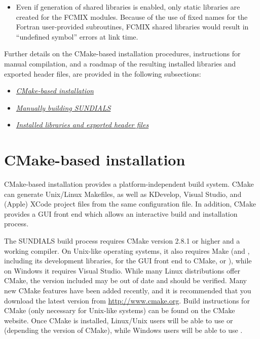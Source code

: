\documentclass[letterpaper,10pt,english]{sphinxmanual}
\begin{document}
\begin{itemize}
\item {} 
Even if generation of shared libraries is enabled, only static
libraries are created for the FCMIX modules.  Because of the use of
fixed names for the Fortran user-provided subroutines, FCMIX shared
libraries would result in ``undefined symbol'' errors at link time.

\end{itemize}

Further details on the CMake-based installation procedures,
instructions for manual compilation, and a roadmap of the resulting
installed libraries and exported header files, are provided in the
following subsections:
\begin{itemize}
\item {} 
{\hyperref[Install:installation-cmake]{\emph{CMake-based installation}}}

\item {} 
{\hyperref[Install:installation-manual]{\emph{Manually building SUNDIALS}}}

\item {} 
{\hyperref[Install:installation-results]{\emph{Installed libraries and exported header files}}}

\end{itemize}


\section{CMake-based installation}
\label{Install:installation-cmake}\label{Install:cmake-based-installation}
CMake-based installation provides a platform-independent build system.
CMake can generate Unix/Linux Makefiles, as well as KDevelop, Visual
Studio, and (Apple) XCode project files from the same configuration
file.  In addition, CMake provides a GUI front end which allows an
interactive build and installation process.

The SUNDIALS build process requires CMake version 2.8.1 or higher and
a working compiler.  On Unix-like operating systems, it also requires
Make (and , including its development libraries, for the GUI
front end to CMake,  or ), while on Windows it
requires Visual Studio.  While many Linux distributions offer CMake,
the version included may be out of date and should be verified.  Many
new CMake features have been added recently, and it is recommended
that you download the latest version from
\href{http://www.cmake.org}{http://www.cmake.org}.  Build instructions for CMake (only necessary
for Unix-like systems) can be found on the CMake website. Once CMake
is installed, Linux/Unix users will be able to use  or
 (depending the version of CMake), while Windows users
will be able to use .
\end{document}
